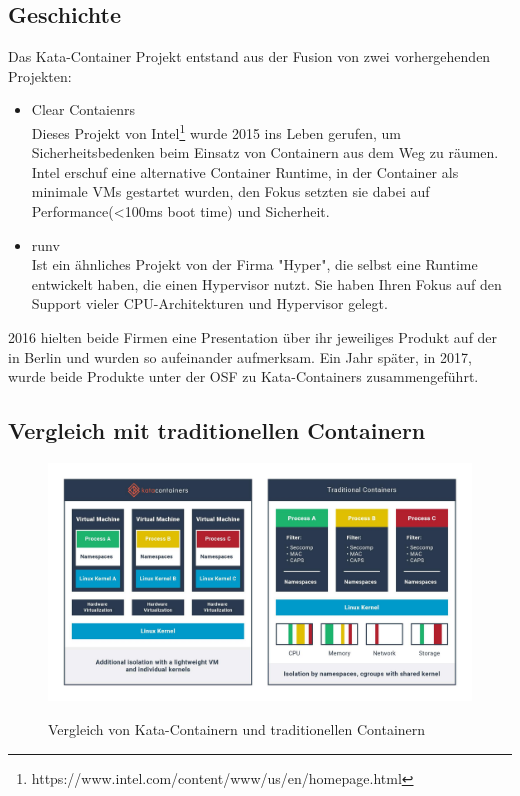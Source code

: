 \subsection{Geschichte}
Das Kata-Container Projekt entstand aus der Fusion von zwei vorhergehenden Projekten:
\begin{itemize}
        \item Clear Contaienrs
        \\Dieses Projekt von Intel\footnote{https://www.intel.com/content/www/us/en/homepage.html} wurde 2015 ins Leben gerufen, um Sicherheitsbedenken beim Einsatz von Containern aus dem Weg zu räumen.
        Intel erschuf eine alternative Container Runtime, in der Container als minimale \ac{VM}s gestartet wurden, den Fokus setzten sie dabei auf Performance(<100ms boot time) und Sicherheit.\cite[S.1]{Kata_Containers}
        \item runv
        \\Ist ein ähnliches Projekt von der Firma "Hyper", die selbst eine Runtime entwickelt haben, die einen Hypervisor nutzt.
        Sie haben Ihren Fokus auf den Support vieler CPU-Architekturen und Hypervisor gelegt.\cite[S.1]{Kata_Containers}
\end{itemize}
2016 hielten beide Firmen eine Presentation über ihr jeweiliges Produkt auf der  in Berlin und wurden so aufeinander aufmerksam.
Ein Jahr später, in 2017, wurde beide Produkte unter der \ac{OSF} zu Kata-Containers zusammengeführt.\cite{kata_history}

\subsection{Vergleich mit traditionellen Containern}

\begin{figure}[ht]
        \caption{Vergleich von Kata-Containern und traditionellen Containern\cite{kata_learn}}
        \centering
        \includegraphics[width=\textwidth]{bilder/katacontainers_traditionalvskata_diagram.jpg}
        \label{fig:kata_vs_traditional}
\end{figure}

